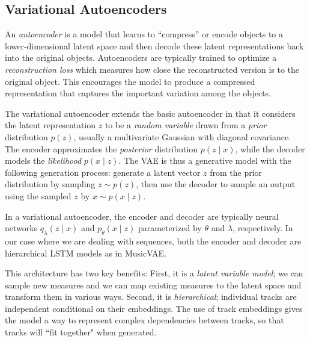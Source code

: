 \documentclass{article}
\begin{document}


\subsection{Variational Autoencoders}
An {\it autoencoder} is a model that learns to ``compress'' or encode objects to a lower-dimensional latent space and then decode these latent representations back into the original objects.  Autoencoders are typically trained to optimize a {\it reconstruction loss} which measures how close the reconstructed version is to the original object.  This encourages the model to produce a compressed representation that captures the important variation among the objects.

The variational autoencoder extends the basic autoencoder in that it considers the latent representation $z$ to be a {\it random variable} drawn from a {\it prior} distribution $p(z)$, usually a multivariate Gaussian with diagonal covariance. The encoder approximates the {\it posterior} distribution $p(z \mid x)$, while the decoder models the {\it likelihood} $p(x \mid z)$.  The VAE is thus a generative model with the following generation process: generate a latent vector $z$ from the prior distribution by sampling $z \sim p(z)$, then use the decoder to sample an output using the sampled $z$ by $x \sim p(x \mid z)$.

In a variational autoencoder, the encoder and decoder are typically neural networks $q_\lambda(z \mid x)$ and $p_\theta(x \mid z)$ parameterized by $\theta$ and $\lambda$, respectively.  In our case where we are dealing with sequences, both the encoder and decoder are hierarchical LSTM \cite{hochreiter1997long} models as in MusicVAE.

This architecture has two key benefits: First, it is a {\it latent variable model}; we can sample new measures and we can map existing measures to the latent space and transform them in various ways.  Second, it is {\it hierarchical}; individual tracks are independent conditional on their embeddings.  The use of track embeddings gives the model a way to represent complex dependencies between tracks, so that tracks will ``fit together" when generated.
\end{document}
